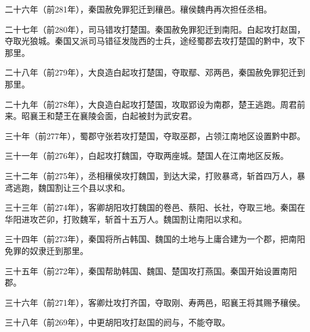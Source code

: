 \documentclass[12pt,UTF8]{ctexbook}
\begin{document}
二十六年（前281年），秦国赦免罪犯迁到穰邑。穰侯魏冉再次担任丞相。

二十七年（前280年），司马错攻打楚国。秦国赦免罪犯迁到南阳。白起攻打赵国，夺取光狼城。秦国又派司马错征发陇西的士兵，途经蜀郡去攻打楚国的黔中，攻下那里。

二十八年（前279年），大良造白起攻打楚国，夺取鄢、邓两邑，秦国赦免罪犯迁到那里。

二十九年（前278年），大良造白起攻打楚国，攻取郢设为南郡，楚王逃跑。周君前来。昭襄王和楚王在襄陵会面，白起被封为武安君。

三十年（前277年），蜀郡守张若攻打楚国，夺取巫郡，占领江南地区设置黔中郡。

三十一年（前276年），白起攻打魏国，夺取两座城。楚国人在江南地区反叛。

三十二年（前275年），丞相穰侯攻打魏国，到达大梁，打败暴鸢，斩首四万人，暴鸢逃跑，魏国割让三个县以求和。

三十三年（前274年），客卿胡阳攻打魏国的卷邑、蔡阳、长社，夺取三地。秦国在华阳进攻芒卯，打败魏军，斩首十五万人。魏国割让南阳以求和。

三十四年（前273年），秦国将所占韩国、魏国的土地与上庸合建为一个郡，把南阳免罪的奴隶迁到那里。

三十五年（前272年），秦国帮助韩国、魏国、楚国攻打燕国。秦国开始设置南阳郡。

三十六年（前271年），客卿灶攻打齐国，夺取刚、寿两邑，昭襄王将其赐予穰侯。

三十八年（前269年），中更胡阳攻打赵国的阏与，不能夺取。
\end{document}
